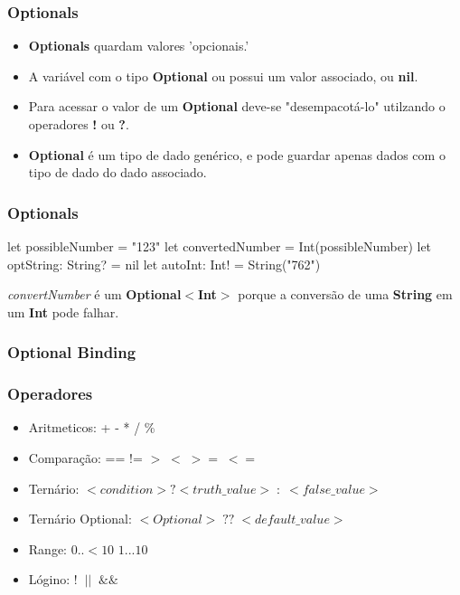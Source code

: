 \begin{frame}[fragile]
    \frametitle{Optionals}
    \begin{itemize}
        \item \textbf{Optionals} quardam valores 'opcionais.'
        \item A variável com o tipo \textbf{Optional} ou possui um valor
        associado, ou \textbf{nil}.
        \item Para acessar o valor de um \textbf{Optional} deve-se
        "desempacotá-lo" utilzando o operadores \textbf{!} ou \textbf{?}.
        \item \textbf{Optional} é um tipo de dado genérico, e pode guardar
        apenas dados com o tipo de dado do dado associado.
    \end{itemize}
\end{frame}

\begin{frame}[fragile]
    \frametitle{Optionals}

    \begin{swift}
        let possibleNumber = "123"
        let convertedNumber = Int(possibleNumber)
        let optString: String? = nil
        let autoInt: Int! = String("762")
    \end{swift}
    \vspace{1cm}
    \textit{convertNumber} é um \textbf{Optional$<$Int$>$} porque a conversão
    de uma \textbf{String} em um \textbf{Int} pode falhar.
\end{frame}

\begin{frame}[fragile]
    \frametitle{Optional Binding}

\end{frame}

\begin{frame}[fragile]
    \frametitle{Operadores}

    \begin{itemize}
        \item Aritmeticos: + - * / \%
        \item Comparação: == != $> \; < \; >= \; <=$
        \item Ternário: $< condition > ? <truth\_value>\;:\;<false\_value> $
        \item Ternário Optional: $<Optional>\;??\;<default\_value> $
        \item Range: $0..{<}10$ $1...10$
        \item Lógino: $!\;\;||\;\;\&\&$
    \end{itemize}
\end{frame}

